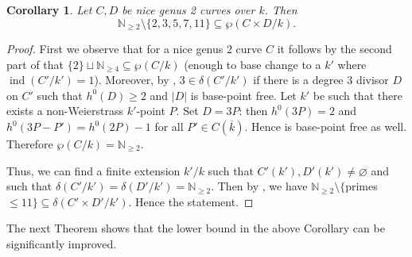 \documentclass[a4paper,11pt]{amsart}
\theoremstyle{plain}
\newtheorem{coroll}[thm]{Corollary}
\theoremstyle{remark}
\newcommand{\dendegs}{\delta}
\newcommand{\potdendegs}{\wp}
\newcommand{\ind}{\operatorname{ind}}
\begin{document}
\begin{coroll}\label{cor:lowerboundonpotdendegscurvesgenus2}
    Let $C,D$ be nice genus 2 curves over $k$. Then
    \[
    \mathbb{N}_{\geq 2} \setminus \{2,3,5,7,11\} \subseteq \potdendegs(C\times D/k).
    \]
\end{coroll} 
\begin{proof} 
First we observe that for a nice genus $2$ curve $C$ it follows by the second part of  that $\{2\}\sqcup \mathbb{N}_{\geq 4} \subseteq \potdendegs(C/k)$ (enough to base change to a $k'$ where $\ind(C'/k')=1$).
Moreover, by \cite[Lemma 4.1.4]{VV}, $3\in \delta(C'/k')$ if  there is a degree 3 divisor $D$ on $C'$ such that $h^0(D)\geq 2$ and $|D|$ is base-point free.
Let $k'$ be such that there exists a non-Weierstrass $k'$-point $P$.
Set $D=3P$: then $h^0(3P)= 2$ and $h^0(3P-P') = h^{0}(2P)-1$ for all $P'\in C(\overline{k})$.
Hence is base-point free as well.
Therefore $\potdendegs(C/k)=\mathbb{N}_{\geq 2}$.
    
Thus, we can find a finite extension $k'/k$ such that $C'(k'), D'(k') \neq \varnothing$ and such that $\dendegs(C'/k')=\dendegs(D'/k')=\mathbb{N}_{\geq 2}$.
Then by , we have $\mathbb{N}_{\geq 2} \setminus \{$primes $\leq 11\}\subseteq \dendegs(C'\times D'/k')$.
Hence the statement.
\end{proof}

The next Theorem shows that the lower bound in the above Corollary can be significantly improved.
\end{document}
